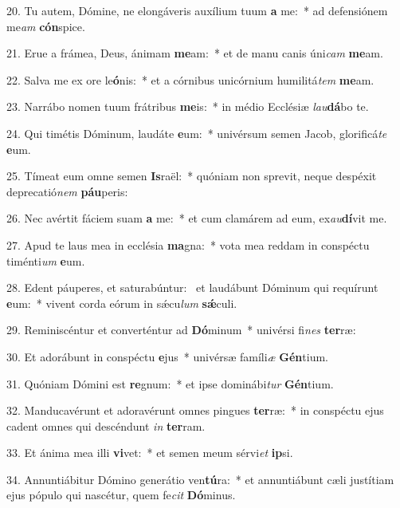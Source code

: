 20. Tu autem, Dómine, ne elongáveris auxílium tuum \textbf{a} me:~*  ad defensiónem me\textit{am} \textbf{cón}spice.\

21. Erue a frámea, Deus, ánimam \textbf{me}am:~*  et de manu canis úni\textit{cam} \textbf{me}am.\

22. Salva me ex ore le\textbf{ó}nis:~*  et a córnibus unicórnium humilitá\textit{tem} \textbf{me}am.\

23. Narrábo nomen tuum frátribus \textbf{me}is:~*  in médio Ecclésiæ \textit{lau}\textbf{dá}bo te.\

24. Qui timétis Dóminum, laudáte \textbf{e}um:~*  univérsum semen Jacob, glorificá\textit{te} \textbf{e}um.\

25. Tímeat eum omne semen \textbf{Is}raël:~*  quóniam non sprevit, neque despéxit deprecatió\textit{nem} \textbf{páu}peris:\

26. Nec avértit fáciem suam \textbf{a} me:~*  et cum clamárem ad eum, ex\textit{au}\textbf{dí}vit me.\

27. Apud te laus mea in ecclésia \textbf{ma}gna:~*  vota mea reddam in conspéctu timénti\textit{um} \textbf{e}um.\

28. Edent páuperes, et saturabúntur: \dag\  et laudábunt Dóminum qui requírunt \textbf{e}um:~*  vivent corda eórum in sǽcu\textit{lum} \textbf{sǽ}culi.\

29. Reminiscéntur et converténtur ad \textbf{Dó}minum~*  univérsi fi\textit{nes} \textbf{ter}ræ:\

30. Et adorábunt in conspéctu \textbf{e}jus~*  univérsæ famíli\textit{æ} \textbf{Gén}tium.\

31. Quóniam Dómini est \textbf{re}gnum:~*  et ipse dominábi\textit{tur} \textbf{Gén}tium.\

32. Manducavérunt et adoravérunt omnes pingues \textbf{ter}ræ:~*  in conspéctu ejus cadent omnes qui descéndunt \textit{in} \textbf{ter}ram.\

33. Et ánima mea illi \textbf{vi}vet:~*  et semen meum sérvi\textit{et} \textbf{ip}si.\

34. Annuntiábitur Dómino generátio ven\textbf{tú}ra:~*  et annuntiábunt cæli justítiam ejus pópulo qui nascétur, quem fe\textit{cit} \textbf{Dó}minus.\

